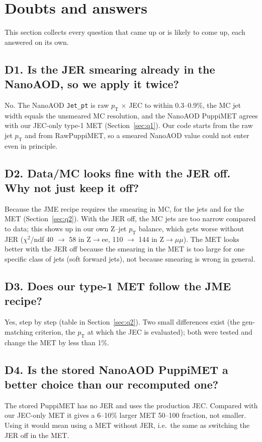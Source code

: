 \documentclass[11pt,a4paper]{article}
\newcommand{\Zee}{Z$\to$ee}
\newcommand{\Zmm}{Z$\to\mu\mu$}
\newcommand{\pt}{$p_\mathrm{T}$}
\begin{document}
\section{Doubts and answers}
\label{sec:doubts}

This section collects every question that came up or is likely to come up, each answered on its own.

\subsection*{D1. Is the JER smearing already in the NanoAOD, so we apply it twice?}
No. The NanoAOD \texttt{Jet\_pt} is raw \pt{} $\times$ JEC to within 0.3--0.9\%, the MC jet width equals the unsmeared MC resolution,
and the NanoAOD PuppiMET agrees with our JEC-only type-1 MET (Section~\ref{sec:q1}). Our code starts from the raw jet \pt{} and from
RawPuppiMET, so a smeared NanoAOD value could not enter even in principle.

\subsection*{D2. Data/MC looks fine with the JER off. Why not just keep it off?}
Because the JME recipe requires the smearing in MC, for the jets and for the MET (Section~\ref{sec:q2}). With the JER off, the MC jets
are too narrow compared to data; this shows up in our own Z--jet \pt{} balance, which gets worse without JER ($\chi^2$/ndf 40 $\to$ 58
in \Zee, 110 $\to$ 144 in \Zmm). The MET looks better with the JER off because the smearing in the MET is too large for one specific
class of jets (soft forward jets), not because smearing is wrong in general.

\subsection*{D3. Does our type-1 MET follow the JME recipe?}
Yes, step by step (table in Section~\ref{sec:q2}). Two small differences exist (the gen-matching criterion, the \pt{} at which the JEC
is evaluated); both were tested and change the MET by less than 1\%.

\subsection*{D4. Is the stored NanoAOD PuppiMET a better choice than our recomputed one?}
The stored PuppiMET has no JER and uses the production JEC. Compared with our JEC-only MET it gives a 6--10\% larger MET 50--100 fraction,
not smaller. Using it would mean using a MET without JER, i.e.\ the same as switching the JER off in the MET.
\end{document}
